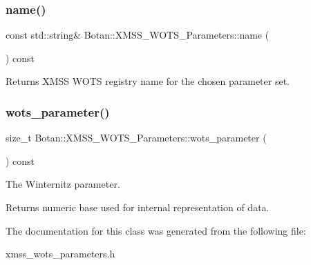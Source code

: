 \subsubsection{\texorpdfstring{name()}{name()}}
{\footnotesize\ttfamily const std\+::string\& Botan\+::\+X\+M\+S\+S\+\_\+\+W\+O\+T\+S\+\_\+\+Parameters\+::name (\begin{DoxyParamCaption}{ }\end{DoxyParamCaption}) const\hspace{0.3cm}{\ttfamily [inline]}}

\begin{DoxyReturn}{Returns}
X\+M\+SS W\+O\+TS registry name for the chosen parameter set. 
\end{DoxyReturn}
\mbox{\label{class_botan_1_1_x_m_s_s___w_o_t_s___parameters_a1226fc756a477864962d5a0d1c88184b}} 
\subsubsection{\texorpdfstring{wots\+\_\+parameter()}{wots\_parameter()}}
{\footnotesize\ttfamily size\+\_\+t Botan\+::\+X\+M\+S\+S\+\_\+\+W\+O\+T\+S\+\_\+\+Parameters\+::wots\+\_\+parameter (\begin{DoxyParamCaption}{ }\end{DoxyParamCaption}) const\hspace{0.3cm}{\ttfamily [inline]}}

The Winternitz parameter.

\begin{DoxyReturn}{Returns}
numeric base used for internal representation of data. 
\end{DoxyReturn}


The documentation for this class was generated from the following file\+:\begin{DoxyCompactItemize}
\item 
xmss\+\_\+wots\+\_\+parameters.\+h\end{DoxyCompactItemize}
